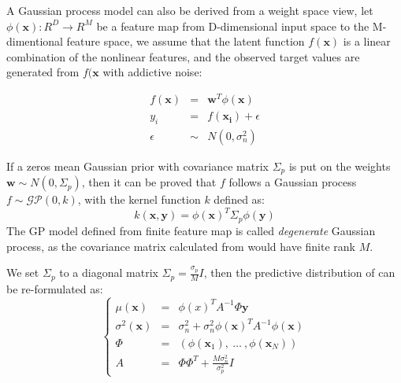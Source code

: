 A Gaussian process model can also be derived from a weight space view, let $\phi(\bm{x}): R^D \rightarrow R^M$ be a feature map from D-dimensional input space to the M-dimentional feature space, we assume that the latent function $f(\bm{x})$ is a linear combination of the nonlinear features, and the observed target values are generated from $f(\bm{x}$ with addictive noise:

\begin{equation}
    \label{eq:weightspace}
    \begin{array}{lll}
        f(\bm{x}) &=&    \bm{w}^T \phi(\bm{x})   \\
        y_i       &=&    f(\bm{x_i}) + \epsilon  \\
        \epsilon  &\sim& N(0, \sigma_n^2)
    \end{array}
\end{equation}

If a zeros mean Gaussian prior with covariance matrix $\Sigma_p$ is put on the weights $\bm{w} \sim N(0, \Sigma_p)$, then it can be proved \cite{GPML} that $f$ follows a Gaussian process $f \sim \mathcal{GP}(0, k)$, with the kernel function $k$ defined as:
\begin{equation}
    \label{eq:kernel_from_weight}
    k(\bm{x}, \bm{y}) = \phi(\bm{x})^T \Sigma_p \phi(\bm{y})
\end{equation}
The GP model defined from finite feature map is called \emph{degenerate} Gaussian process, as the covariance matrix calculated from  would have finite rank $M$.


We set $\Sigma_p$ to a diagonal matrix $\Sigma_p = \frac{\sigma_p}{M} I$, then the predictive distribution of  can be re-formulated as:
\begin{equation}
    \left\{
        \begin{array}{lll}
            \mu(\bm{x})      &= & \phi(x)^T A^{-1} \Phi \bm{y} \\
            \sigma^2(\bm{x}) &= & \sigma_n^2 + \sigma_n^2 \phi(\bm{x})^T A^{-1} \phi(\bm{x}) \\
            \Phi             &= & (\phi(\bm{x}_1),~\dots~,\phi(\bm{x}_N)) \\
            A                &= & \Phi \Phi^T + \frac{M \sigma_n^2}{\sigma_p^2} I
        \end{array}
    \right.
    \label{eq:DegeneratePred}
\end{equation}

